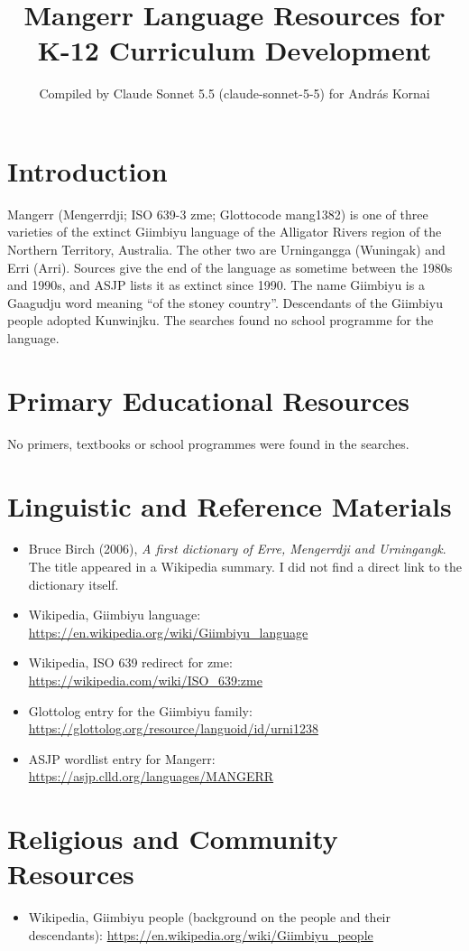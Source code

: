 \documentclass[12pt]{article}
\title{Mangerr Language Resources for K-12 Curriculum Development}
\author{Compiled by Claude Sonnet 5.5 (claude-sonnet-5-5) for Andr\'as Kornai}
\date{}
\begin{document}
\maketitle

\section{Introduction}
Mangerr (Mengerrdji; ISO 639-3 zme; Glottocode mang1382) is one of three varieties of the extinct Giimbiyu language of the Alligator Rivers region of the Northern Territory, Australia. The other two are Urningangga (Wuningak) and Erri (Arri). Sources give the end of the language as sometime between the 1980s and 1990s, and ASJP lists it as extinct since 1990. The name Giimbiyu is a Gaagudju word meaning ``of the stoney country''. Descendants of the Giimbiyu people adopted Kunwinjku. The searches found no school programme for the language.

\section{Primary Educational Resources}
No primers, textbooks or school programmes were found in the searches.

\section{Linguistic and Reference Materials}
\begin{itemize}
\item Bruce Birch (2006), \emph{A first dictionary of Erre, Mengerrdji and Urningangk}. The title appeared in a Wikipedia summary. I did not find a direct link to the dictionary itself.
\item Wikipedia, Giimbiyu language: \url{https://en.wikipedia.org/wiki/Giimbiyu_language}
\item Wikipedia, ISO 639 redirect for zme: \url{https://wikipedia.com/wiki/ISO_639:zme}
\item Glottolog entry for the Giimbiyu family: \url{https://glottolog.org/resource/languoid/id/urni1238}
\item ASJP wordlist entry for Mangerr: \url{https://asjp.clld.org/languages/MANGERR}
\end{itemize}

\section{Religious and Community Resources}
\begin{itemize}
\item Wikipedia, Giimbiyu people (background on the people and their descendants): \url{https://en.wikipedia.org/wiki/Giimbiyu_people}
\end{itemize}
\end{document}
